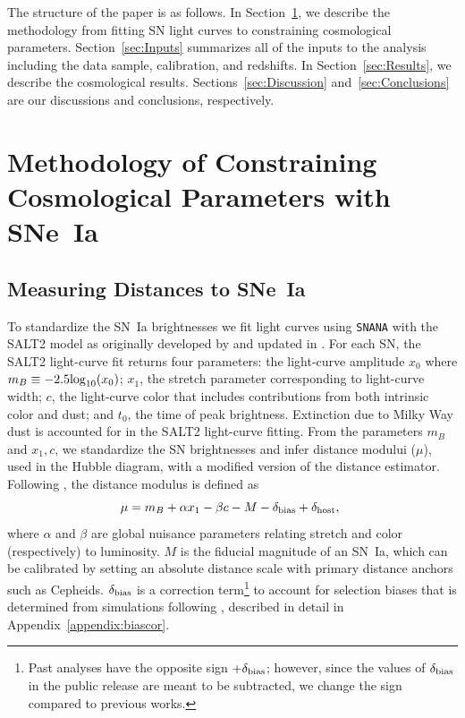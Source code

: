 \documentclass[twocolumn]{aastex63}
\begin{document}
The structure of the paper is as follows.  In Section~\ref{sec:Method}, we describe the methodology from fitting SN light curves to constraining cosmological parameters. Section~\ref{sec:Inputs} summarizes all of the inputs to the analysis including the data sample, calibration, and redshifts. In Section~\ref{sec:Results}, we describe the cosmological results. Sections~\ref{sec:Discussion} and~\ref{sec:Conclusions} are our discussions and conclusions, respectively. 



\section{Methodology of Constraining Cosmological Parameters with SNe~Ia}
\label{sec:Method}

\subsection{Measuring Distances to SNe~Ia}
To standardize the SN~Ia brightnesses we fit light curves using \texttt{SNANA} with the SALT2 model as originally developed by \cite{Guy10} { and updated in \citealp[hereafter SALT2-B22]{fragilistic}}. For each SN, the SALT2 light-curve fit returns four parameters: the light-curve amplitude $x_0$ where $m_B \equiv -2.5{\rm log}_{10}(x_0)$; $x_1$, the stretch parameter corresponding to light-curve width; $c$, the light-curve color {that includes contributions from both intrinsic color and dust}; and $t_0$, the time of peak brightness. {Extinction due to Milky Way dust is accounted for in the SALT2 light-curve fitting.}
From the parameters $m_B$ and $x_1,c$, we standardize the SN brightnesses and infer distance modului ($\mu$), used in the Hubble diagram, with a modified version of the \citet{Tripp98} distance estimator. 
Following \cite[][hereafter BBC]{BBC}, the distance modulus is defined as
\begin{equation}
    \mu=m_B + \alpha x_1 - \beta c - M  - \delta_{\rm bias} +\delta_{\rm host},~\label{eq:Tripp}
\end{equation}
where $\alpha$ and $\beta$ are global nuisance parameters relating stretch and color (respectively) to luminosity. $M$ is the fiducial magnitude of an SN~Ia, which can be calibrated by setting an absolute distance scale with primary distance anchors such as Cepheids. $\delta_{\rm bias}$ is a correction term\footnote{Past analyses have the opposite sign $ +\delta_{\rm bias}$; however, since the values of $\delta_{\rm bias}$ in the public release are meant to be subtracted, we change the sign compared to previous works.} to account for selection biases that is determined from simulations following \cite{popovic21a}, described in detail in Appendix~\ref{appendix:biascor}.
\end{document}

